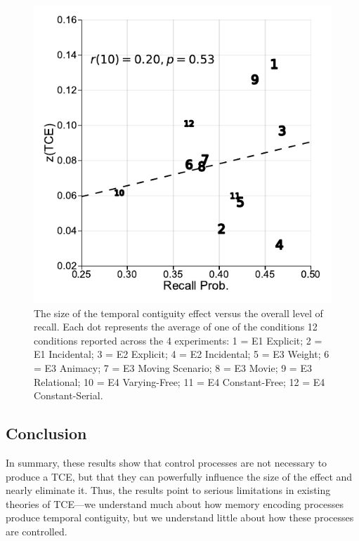 \documentclass[man,natbib,floatsintext]{apa6} %
\begin{document}
\begin{figure}%
\includegraphics{figures/correlation.pdf}
\caption{The size of the temporal contiguity effect versus the overall level of recall. Each dot represents the average of one of the conditions 12 conditions reported across the 4 experiments: 1 = E1 Explicit; 2 = E1 Incidental; 3 = E2 Explicit; 4 = E2 Incidental; 5 = E3 Weight; 6 = E3 Animacy; 7 = E3 Moving Scenario; 8 = E3 Movie; 9 = E3 Relational; 10 = E4 Varying-Free; 11 = E4 Constant-Free; 12 = E4 Constant-Serial.}
\label{corr}
\end{figure}

\color{black}


\subsection{Conclusion}
In summary, these results show that control processes are not necessary to produce a TCE, but that they can powerfully influence the size of the effect and nearly eliminate it. Thus, the results point to serious limitations in existing theories of TCE---we understand much about how memory encoding processes produce temporal contiguity, but we understand little about how these processes are controlled.


\end{document}
